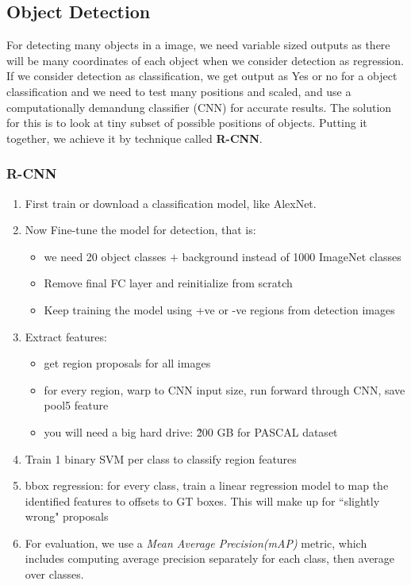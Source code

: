 \documentclass[12pt,a4paper]{article}
\begin{document}
\subsection{Object Detection}
For detecting many objects in a image, we need variable sized outputs as there will be many coordinates of each object when we consider detection as regression. If we consider detection as classification, we get output as Yes or no for a object classification and we need to test many positions and scaled, and use a computationally demandung classifier (CNN) for accurate results. The solution for this is to look at tiny subset of possible positions of objects. Putting it together, we achieve it by technique called \textbf{R-CNN}.

\subsubsection{R-CNN}
\begin{enumerate}
    \item First train or download a classification model, like AlexNet.
    \item Now Fine-tune the model for detection, that is:
    \begin{itemize}
        \item we need 20 object classes $+$ background instead of 1000 ImageNet classes
        \item Remove final FC layer and reinitialize from scratch
        \item Keep training the model using +ve or -ve regions from detection images
    \end{itemize}
    \item Extract features:
    \begin{itemize}
        \item get region proposals for all images
        \item for every region, warp to CNN input size, run forward through CNN, save pool5 feature
        \item you will need a big hard drive: \~200 GB for PASCAL dataset
    \end{itemize}
    \item Train 1 binary SVM per class to classify region features
    \item bbox regression: for every class, train a linear regression model to map the identified features to offsets to GT boxes. This will make up for ``slightly wrong" proposals
    \item For evaluation, we use a \textit{Mean Average Precision(mAP)} metric, which includes computing average precision separately for each class, then average over classes.
\end{enumerate}
\end{document}
